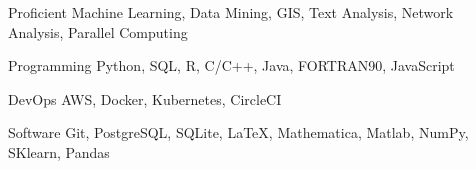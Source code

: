 

\begin{cvskills}

  \cvskill
    {Proficient} %
    {Machine Learning, Data Mining, GIS, Text Analysis, Network Analysis, Parallel Computing} %

  \cvskill
    {Programming} %
    {Python, SQL, R, C/C++, Java, FORTRAN90, JavaScript} %


    \cvskill
     {DevOps} %
     {AWS, Docker, Kubernetes, CircleCI} %


  \cvskill
    {Software} %
    {Git, PostgreSQL, SQLite, \LaTeX, Mathematica, Matlab, NumPy, SKlearn, Pandas} %



\end{cvskills}

